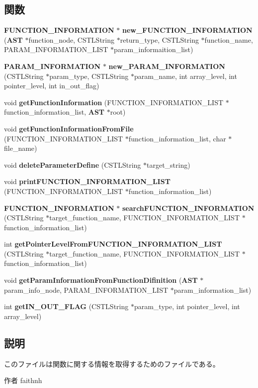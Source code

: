 \subsection*{関数}
\begin{DoxyCompactItemize}
\item 
{\bf FUNCTION\_\-INFORMATION} $\ast$ {\bf new\_\-FUNCTION\_\-INFORMATION} ({\bf AST} $\ast$function\_\-node, CSTLString $\ast$return\_\-type, CSTLString $\ast$function\_\-name, PARAM\_\-INFORMATION\_\-LIST $\ast$param\_\-informaition\_\-list)
\item 
{\bf PARAM\_\-INFORMATION} $\ast$ {\bf new\_\-PARAM\_\-INFORMATION} (CSTLString $\ast$param\_\-type, CSTLString $\ast$param\_\-name, int array\_\-level, int pointer\_\-level, int in\_\-out\_\-flag)
\item 
void {\bf getFunctionInformation} (FUNCTION\_\-INFORMATION\_\-LIST $\ast$function\_\-information\_\-list, {\bf AST} $\ast$root)
\item 
void {\bf getFunctionInformationFromFile} (FUNCTION\_\-INFORMATION\_\-LIST $\ast$function\_\-information\_\-list, char $\ast$file\_\-name)
\item 
void {\bf deleteParameterDefine} (CSTLString $\ast$target\_\-string)
\item 
void {\bf printFUNCTION\_\-INFORMATION\_\-LIST} (FUNCTION\_\-INFORMATION\_\-LIST $\ast$function\_\-information\_\-list)
\item 
{\bf FUNCTION\_\-INFORMATION} $\ast$ {\bf searchFUNCTION\_\-INFORMATION} (CSTLString $\ast$target\_\-function\_\-name, FUNCTION\_\-INFORMATION\_\-LIST $\ast$function\_\-information\_\-list)
\item 
int {\bf getPointerLevelFromFUNCTION\_\-INFORMATION\_\-LIST} (CSTLString $\ast$target\_\-function\_\-name, FUNCTION\_\-INFORMATION\_\-LIST $\ast$function\_\-information\_\-list)
\item 
void {\bf getParamInformationFromFunctionDifinition} ({\bf AST} $\ast$param\_\-info\_\-node, PARAM\_\-INFORMATION\_\-LIST $\ast$param\_\-information\_\-list)
\item 
int {\bf getIN\_\-OUT\_\-FLAG} (CSTLString $\ast$param\_\-type, int pointer\_\-level, int array\_\-level)
\end{DoxyCompactItemize}


\subsection{説明}
このファイルは関数に関する情報を取得するためのファイルである。 \begin{DoxyAuthor}{作者}
faithnh 
\end{DoxyAuthor}


